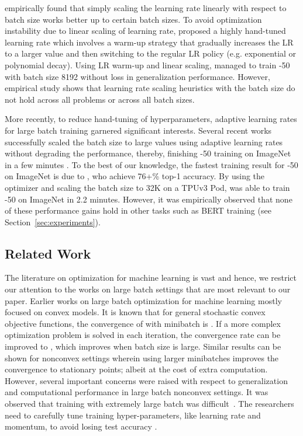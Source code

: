 \documentclass{article} \usepackage{iclr2020_conference,times}
\begin{document}
\citep{krizhevsky2014one} empirically found that simply scaling the learning rate linearly with respect to batch size works better up to certain batch sizes. To avoid optimization instability due to linear scaling of learning rate, \citet{goyal2017accurate} proposed a highly hand-tuned learning rate which involves a warm-up strategy that gradually increases the LR to a larger value and then switching to the regular LR policy (e.g. exponential or polynomial decay). Using LR warm-up and linear scaling, \citet{goyal2017accurate} managed to train -50 with batch size 8192 without loss in generalization performance. However, empirical study \citep{shallue2018measuring} shows that learning rate scaling heuristics with the batch size do not hold across all problems or across all batch sizes.

More recently, to reduce hand-tuning of hyperparameters, adaptive learning rates for large batch training garnered significant interests. Several recent works successfully scaled the batch size to large values using adaptive learning rates without degrading the performance, thereby, finishing -50 training on ImageNet in a few minutes \citep{you2018imagenet,iandola2016firecaffe,codreanu2017scale,akiba2017extremely,jia2018highly,smith2017don,martens2015optimizing,devarakonda2017adabatch,mikami2018imagenet,osawa2018second,you2019large,yamazaki2019yet}.
To the best of our knowledge, the fastest training result for -50 on ImageNet is due to \cite{ying2018image}, who achieve 76+\% top-1 accuracy. By using the  optimizer and scaling the batch size to 32K  on a TPUv3 Pod, \citet{ying2018image} was able to train -50 on ImageNet in 2.2 minutes. However, it was empirically observed that none of these performance gains hold in other tasks such as BERT training (see Section~\ref{sec:experiments}).  


\iffalse
\subsection{Related Work}

The literature on optimization for machine learning is vast and hence, we restrict our attention to the works on large batch settings that are most relevant to our paper. Earlier works on large batch optimization for machine learning mostly focused on convex models. It is known that for general stochastic convex objective functions, the convergence of  with minibatch  is .  If a more complex optimization problem is solved in each iteration, the convergence rate can be improved to , which improves when batch size  is large. Similar results can be shown for nonconvex settings wherein using larger minibatches improves the convergence to stationary points; albeit at the cost of extra computation. However, several important concerns were raised with respect to generalization and computational performance in large batch nonconvex settings. It was observed that training with extremely large batch was difficult~\citep{keskar2016large, hoffer2017train}. The researchers need to carefully tune training hyper-parameters, like learning rate and momentum, to avoid losing test accuracy \citep{goyal2017accurate, li2017scaling, you2018imagenet, shallue2018measuring}. 
\end{document}
